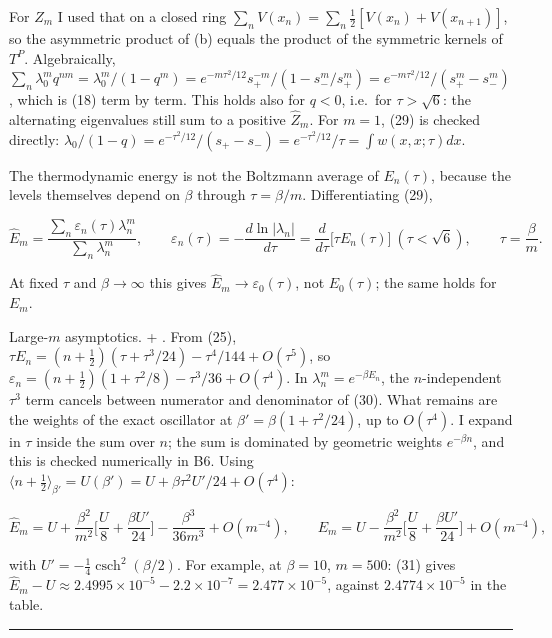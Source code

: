\documentclass[11pt,a4paper]{article}
\newcommand{\tagmark}[1]{\marginnote{\scriptsize\ttfamily #1}}
\newcommand{\Dtag}{\tagmark{[D]}}   %
\begin{document}
For \(Z_m\) I used that on a closed ring
\(\sum_nV(x_n) = \sum_n\tfrac12[V(x_n)+V(x_{n+1})]\), so the asymmetric
product of (b) equals the product of the symmetric kernels of \(T^P\).
Algebraically,
\(\sum_n\lambda_0^mq^{nm} = \lambda_0^m/(1-q^m) = e^{-m\tau^2/12}s_+^{-m}/(1-s_-^m/s_+^m) = e^{-m\tau^2/12}/(s_+^m-s_-^m)\),
which is (18) term by term. This holds also for \(q<0\), i.e.~for
\(\tau>\sqrt6\): the alternating eigenvalues still sum to a positive
\(\hat Z_m\). For \(m=1\), (29) is checked directly:
\(\lambda_0/(1-q) = e^{-\tau^2/12}/(s_+-s_-) = e^{-\tau^2/12}/\tau = \int w(x,x;\tau)dx\).

The thermodynamic energy is not the Boltzmann average of \(E_n(\tau)\),
because the levels themselves depend on \(\beta\) through
\(\tau = \beta/m\). Differentiating (29),

\[
\hat E_m = \frac{\sum_n\varepsilon_n(\tau)\lambda_n^m}{\sum_n\lambda_n^m},\qquad \varepsilon_n(\tau) = -\frac{d\ln|\lambda_n|}{d\tau} = \frac{d}{d\tau}\big[\tau E_n(\tau)\big]\ (\tau<\sqrt6),\qquad \tau = \frac\beta m. \tag{30}
\]

At fixed \(\tau\) and \(\beta\to\infty\) this gives
\(\hat E_m\to\varepsilon_0(\tau)\), not \(E_0(\tau)\); the same holds
for \(E_m\).

Large-\(m\) asymptotics. \Dtag{} + \tagmark{[A3]}. From (25),
\(\tau E_n = (n+\tfrac12)(\tau + \tau^3/24) - \tau^4/144 + O(\tau^5)\),
so \(\varepsilon_n = (n+\tfrac12)(1+\tau^2/8) - \tau^3/36 + O(\tau^4)\).
In \(\lambda_n^m = e^{-\beta E_n}\), the \(n\)-independent \(\tau^3\)
term cancels between numerator and denominator of (30). What remains are
the weights of the exact oscillator at \(\beta' = \beta(1+\tau^2/24)\),
up to \(O(\tau^4)\). \tagmark{[A3]} I expand in \(\tau\) inside the sum
over \(n\); the sum is dominated by geometric weights \(e^{-\beta n}\),
and this is checked numerically in B6. Using
\(\langle n+\tfrac12\rangle_{\beta'} = U(\beta') = U + \beta\tau^2U'/24 + O(\tau^4)\):

\[
\hat E_m = U + \frac{\beta^2}{m^2}\Big[\frac U8 + \frac{\beta U'}{24}\Big] - \frac{\beta^3}{36m^3} + O(m^{-4}),\qquad
E_m = U - \frac{\beta^2}{m^2}\Big[\frac U8 + \frac{\beta U'}{24}\Big] + O(m^{-4}), \tag{31}
\]

with \(U' = -\tfrac14\operatorname{csch}^2(\beta/2)\). For example, at
\(\beta=10\), \(m=500\): (31) gives
\(\hat E_m - U \approx 2.4995\times10^{-5} - 2.2\times10^{-7} = 2.477\times10^{-5}\),
against \(2.4774\times10^{-5}\) in the table.

\begin{center}\rule{0.5\linewidth}{0.5pt}\end{center}
\end{document}
